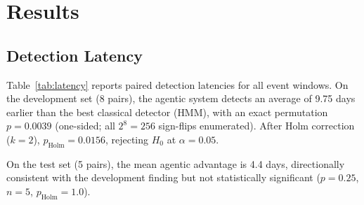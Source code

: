 \documentclass[11pt,a4paper]{article}
\begin{document}
\section{Results}\label{sec:results}

\subsection{Detection Latency}\label{sec:results-latency}

Table~\ref{tab:latency} reports paired detection latencies for all event
windows. On the development set (8 pairs), the agentic system detects an
average of 9.75 days earlier than the best classical detector (HMM), with an
exact permutation $p = 0.0039$ (one-sided; all $2^8 = 256$ sign-flips
enumerated). After Holm correction ($k = 2$), $p_\text{Holm} = 0.0156$,
rejecting $H_0$ at $\alpha = 0.05$.

On the test set (5 pairs), the mean agentic advantage is 4.4 days, directionally
consistent with the development finding but not statistically significant
($p = 0.25$, $n = 5$, $p_\text{Holm} = 1.0$).
\end{document}
